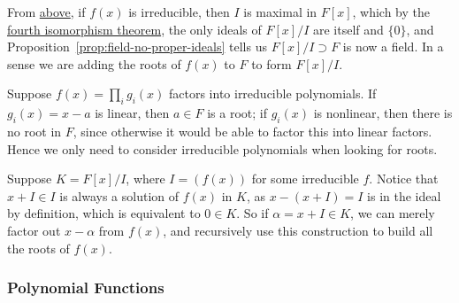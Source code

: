 \begin{remark}
    From \hyperref[thm:ideal-divisibility]{above},
    if \(f(x)\) is irreducible, then \(I\) is maximal in \(F[x]\),
    which by the \hyperref[thm:iso-4-ring]{fourth isomorphism theorem},
    the only ideals of \(F[x]/I\) are itself and \(\{0\}\),
    and Proposition~\ref{prop:field-no-proper-ideals}
    tells us \(F[x]/I \supset F\) is now a field.
    In a sense we are adding the roots of \(f(x)\) to \(F\) to form \(F[x]/I\).

    Suppose \(f(x) = \prod_i g_i(x)\) factors into irreducible polynomials.
    If \(g_i(x) = x-a\) is linear, then \(a \in F\) is a root;
    if \(g_i(x)\) is nonlinear, then there is no root in \(F\),
    since otherwise it would be able to factor this into linear factors.
    Hence we only need to consider irreducible polynomials
    when looking for roots.

    Suppose \(K = F[x]/I\), where \(I = (f(x))\) for some irreducible \(f\).
    Notice that \(x+I \in I\) is always a solution of \(f(x)\) in \(K\),
    as \(x-(x+I) = I\) is in the ideal by definition,
    which is equivalent to \(0 \in K\).
    So if \(\alpha = x+I \in K\),
    we can merely factor out \(x-\alpha\) from \(f(x)\),
    and recursively use this construction to build all the roots of \(f(x)\).
\end{remark}

\subsubsection*{Polynomial Functions}

